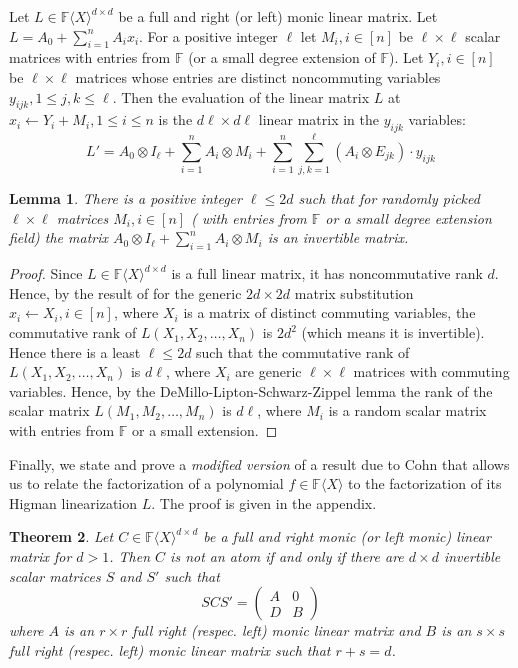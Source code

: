 \documentclass[10pt,a4paper]{article}
\newtheorem{theorem}{Theorem}[section]
\newtheorem{lemma}[theorem]{Lemma}
\newcommand{\F}{\mathbb{F}}
\renewcommand{\angle}[1]{\langle #1 \rangle}
\newcommand{\FX}{\F\angle{X}}
\newcommand{\fR}{\FX}
\begin{document}
%
%
%
%
%
%
%
%
%
%
%
%
%
%
%
%
%
%
%
%
%
%
%
%
%
%
%
%
%
%
%
%
%
%

Let $L \in\fR^{d\times d}$ be a full and right (or left) monic linear matrix. Let
$L=A_0+\sum_{i=1}^n A_i x_i$. For a positive integer $\ell$ let $M_i,
i\in [n]$ be $\ell\times \ell$ scalar matrices with entries from $\F$
(or a small degree extension of $\F$). Let $Y_i, i\in [n]$ be
$\ell\times \ell$ matrices whose entries are distinct noncommuting
variables $y_{ijk}, 1\le j, k\le \ell$. Then the evaluation of the
linear matrix $L$ at $x_i\leftarrow Y_i+M_i, 1\le i\le n$ is the
$d\ell\times d\ell$ linear matrix in the $y_{ijk}$ variables:
\[
L' = A_0\otimes I_\ell + \sum_{i=1}^n A_i\otimes M_i +
\sum_{i=1}^n\sum_{j,k=1}^\ell (A_i\otimes E_{jk})\cdot y_{ijk}
\]

\begin{lemma}\label{shift-inv-lemma}
  There is a positive integer $\ell\le 2d$ such that for randomly
  picked $\ell \times \ell$ matrices $M_i, i\in[n]$ ( with entries
  from $\F$ or a small degree extension field) the matrix
  $A_0\otimes I_\ell + \sum_{i=1}^n A_i\otimes M_i$ is an
  invertible matrix.
\end{lemma}

\begin{proof}
Since $L\in\fR^{d\times d}$ is a full linear matrix, it has
noncommutative rank $d$. Hence, by the result of \cite{DM17} for the
generic $2d\times 2d$ matrix substitution $x_i \leftarrow X_i,
i\in[n]$, where $X_i$ is a matrix of distinct commuting variables, the
commutative rank of $L(X_1,X_2,\ldots,X_n)$ is $2d^2$ (which means it
is invertible). Hence there is a least $\ell\le 2d$ such that the
commutative rank of $L(X_1,X_2,\ldots,X_n)$ is $d\ell$, where $X_i$
are generic $\ell\times \ell$ matrices with commuting variables.
Hence, by the DeMillo-Lipton-Schwarz-Zippel lemma \cite{DL78,Sch80,Zip79} the
rank of the scalar matrix $L(M_1,M_2,\ldots,M_n)$ is $d\ell$, where
$M_i$ is a random scalar matrix with entries from $\F$ or a small
extension.
\end{proof}

Finally, we state and prove a \emph{modified version} of a result due
to Cohn that allows us to relate the factorization of a polynomial
$f\in\fR$ to the factorization of its Higman linearization $L$. The
proof is given in the appendix.

\begin{theorem}{\rm\cite[Theorem 5.8.8]{Cohnfir}}\label{cohnthm}
  Let $C\in\fR^{d\times d}$ be a full and right monic (or left monic)
  linear matrix for $d>1$. Then $C$ is not an atom if and only if
  there are $d\times d$ invertible scalar matrices $S$ and $S'$ such
  that
  \begin{equation}\label{eq-cohnthm}
  SCS' =
  \left(
\begin{array}{cc}
A & 0 \\
D & B
\end{array}
\right)
\end{equation}
where $A$ is an $r\times r$ full right (respec. left) monic linear matrix and $B$ is
an $s\times s$ full right (respec. left) monic linear matrix such that $r+s=d$.
\end{theorem}
\end{document}

